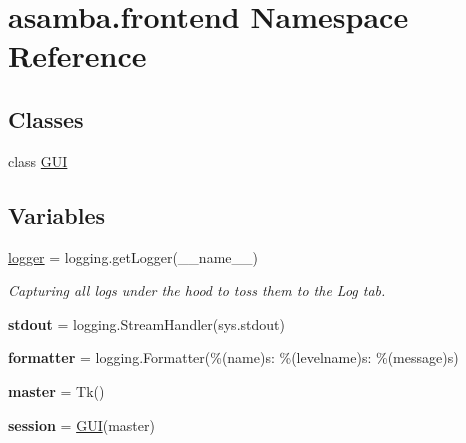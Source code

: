 \hypertarget{namespaceasamba_1_1frontend}{}\section{asamba.\+frontend Namespace Reference}
\label{namespaceasamba_1_1frontend}
\subsection*{Classes}
\begin{DoxyCompactItemize}
\item 
class \hyperlink{classasamba_1_1frontend_1_1_g_u_i}{G\+UI}
\end{DoxyCompactItemize}
\subsection*{Variables}
\begin{DoxyCompactItemize}
\item 
\mbox{\label{namespaceasamba_1_1frontend_a69e38c2fd23f7d69379cf0ad9be2918e}} 
\hyperlink{namespaceasamba_1_1frontend_a69e38c2fd23f7d69379cf0ad9be2918e}{logger} = logging.\+get\+Logger(\+\_\+\+\_\+name\+\_\+\+\_\+)
\begin{DoxyCompactList}\small\item\em Capturing all logs under the hood to toss them to the Log tab. \end{DoxyCompactList}\item 
\mbox{\label{namespaceasamba_1_1frontend_a2edc421a47737cb1305a9f4a81aa3035}} 
{\bfseries stdout} = logging.\+Stream\+Handler(sys.\+stdout)
\item 
\mbox{\label{namespaceasamba_1_1frontend_ab66d69a53f458beccf2b7c34ea87696d}} 
{\bfseries formatter} = logging.\+Formatter(\textquotesingle{}\%(name)s\+: \%(levelname)s\+: \%(message)s\textquotesingle{})
\item 
\mbox{\label{namespaceasamba_1_1frontend_a210c55a01645118986bda6851c802eaf}} 
{\bfseries master} = Tk()
\item 
\mbox{\label{namespaceasamba_1_1frontend_a5bb008fcb3fe950c78730b2d38210348}} 
{\bfseries session} = \hyperlink{classasamba_1_1frontend_1_1_g_u_i}{G\+UI}(master)
\end{DoxyCompactItemize}


